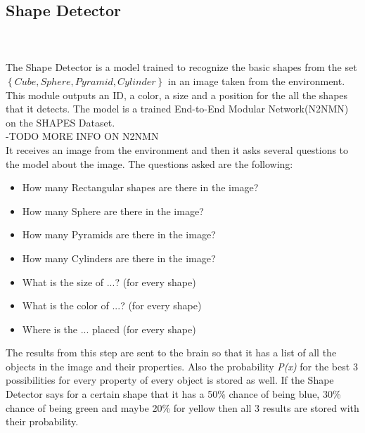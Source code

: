 \documentclass{article}
\begin{document}
     \subsection{Shape Detector}
     \\\\
     The Shape Detector is a model trained to recognize the basic shapes from the set $\left\{Cube , Sphere, Pyramid, Cylinder \right\}$ in an image taken from the environment. This module outputs an ID, a color, a size and a position for the all the shapes that it detects. The model is a trained End-to-End Modular Network(N2NMN) on the SHAPES Dataset.\\
     -TODO MORE INFO ON N2NMN\\
     It receives an image from the environment and then it asks several questions to the model about the image. The questions asked are the following:
     \begin{itemize}
     	\item How many Rectangular shapes are there in the image?
     	\item How many Sphere are there in the image?
     	\item How many Pyramids are there in the image?
     	\item How many Cylinders are there in the image?
     	\item What is the size of ...? (for every shape)
     	\item What is the color of ...? (for every shape)
     	\item Where is the ... placed (for every shape)
     \end{itemize}
 	 The results from this step are sent to the brain so that it has a list of all the objects in the image and their properties. Also the probability \textit{P(x)} for the best 3 possibilities for every property of every object is stored as well. If the Shape Detector says for a certain shape that it has a 50\% chance of being blue, 30\% chance of being green and maybe 20\% for yellow then all 3 results are stored with their probability.
\end{document}
